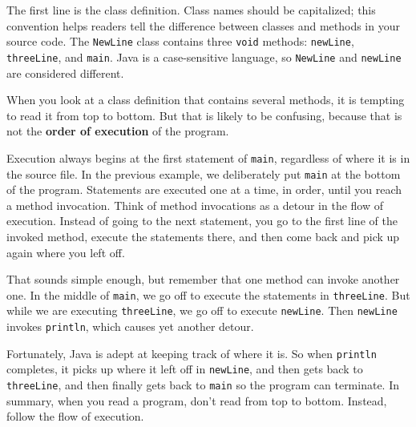 \documentclass[12pt]{book}
\makeatletter
\theoremstyle{exercise}
\newcommand{\java}[1]{\verb"#1"}
\renewcommand\subsection{\@startsection{subsection}{2}{\z@}%
    {-3.25ex\@plus -1ex \@minus -.2ex}%
    {0.3ex \@plus .2ex}%
    {\normalfont\large\bfseries}}
\newcommand{\java}[1]{\lstinline{#1}} %
\makeatother
\begin{document}

The first line is the class definition.
Class names should be capitalized; this convention helps readers tell the difference between classes and methods in your source code.
The \java{NewLine} class contains three \java{void} methods: \java{newLine}, \java{threeLine}, and \java{main}.
Java is a case-sensitive language, so \java{NewLine} and \java{newLine} are considered different.



When you look at a class definition that contains several methods, it is tempting to read it from top to bottom.
But that is likely to be confusing, because that is not the {\bf order of execution} of the program.

Execution always begins at the first statement of \java{main}, regardless of where it is in the source file.
In the previous example, we deliberately put \java{main} at the bottom of the program.
Statements are executed one at a time, in order, until you reach a method invocation.
Think of method invocations as a detour in the flow of execution.
Instead of going to the next statement, you go to the first line of the invoked method, execute the statements there, and then come back and pick up again where you left off.

That sounds simple enough, but remember that one method can invoke another one.
In the middle of \java{main}, we go off to execute the statements in \java{threeLine}.
But while we are executing \java{threeLine}, we go off to execute \java{newLine}.
Then \java{newLine} invokes \java{println}, which causes yet another detour.

Fortunately, Java is adept at keeping track of where it is.
So when \java{println} completes, it picks up where it left off in \java{newLine}, and then gets back to \java{threeLine}, and then finally gets back to \java{main} so the program can terminate.
In summary, when you read a program, don't read from top to bottom.
Instead, follow the flow of execution.

\end{document}
